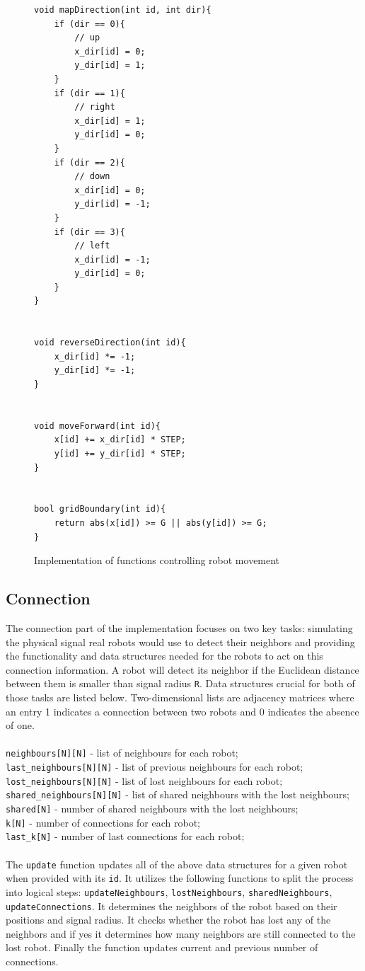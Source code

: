 \begin{figure}[H]
\caption{Implementation of functions controlling robot movement}
\begin{lstlisting}[style=code]
void mapDirection(int id, int dir){
    if (dir == 0){
		// up
        x_dir[id] = 0;
        y_dir[id] = 1;
    }
    if (dir == 1){
		// right
        x_dir[id] = 1;
        y_dir[id] = 0;
    }
    if (dir == 2){
		// down
        x_dir[id] = 0;
        y_dir[id] = -1;
    }
    if (dir == 3){
		// left
        x_dir[id] = -1;
        y_dir[id] = 0;
    }
}


void reverseDirection(int id){
	x_dir[id] *= -1;
	y_dir[id] *= -1;
}


void moveForward(int id){
	x[id] += x_dir[id] * STEP;
	y[id] += y_dir[id] * STEP;
}


bool gridBoundary(int id){
    return abs(x[id]) >= G || abs(y[id]) >= G;
}
\end{lstlisting}
\label{fig:movement_implementation}
\end{figure}
\newpage

\subsection{Connection}
The connection part of the implementation focuses on two key tasks: simulating the physical signal real robots would use to detect their neighbors and providing the functionality and data structures needed for the robots to act on this connection information. A robot will detect its neighbor if the Euclidean distance between them is smaller than signal radius \texttt{R}. Data structures crucial for both of those tasks are listed below. Two-dimensional lists are adjacency matrices where an entry 1 indicates a connection between two robots and 0 indicates the absence of one. \\\\
\texttt{neighbours[N][N]} - list of neighbours for each robot;\\
\texttt{last\_neighbours[N][N]} - list of previous neighbours for each robot;\\ 
\texttt{lost\_neighbours[N][N]} - list of lost neighbours for each robot;\\
\texttt{shared\_neighbours[N][N]} - list of shared neighbours with the lost neighbours;\\
\texttt{shared[N]} - number of shared neighbours with the lost neighbours;\\
\texttt{k[N]} - number of connections for each robot;\\
\texttt{last\_k[N]} - number of last connections for each robot;\\
\\
The \texttt{update} function updates all of the above data structures for a given robot when provided with its \texttt{id}. It utilizes the following functions to split the process into logical steps: \texttt{updateNeighbours}, \texttt{lostNeighbours}, \texttt{sharedNeighbours}, \texttt{updateConnections}. It determines the neighbors of the robot based on their positions and signal radius. It checks whether the robot has lost any of the neighbors and if yes it determines how many neighbors are still connected to the lost robot. Finally the function updates current and previous number of connections.

